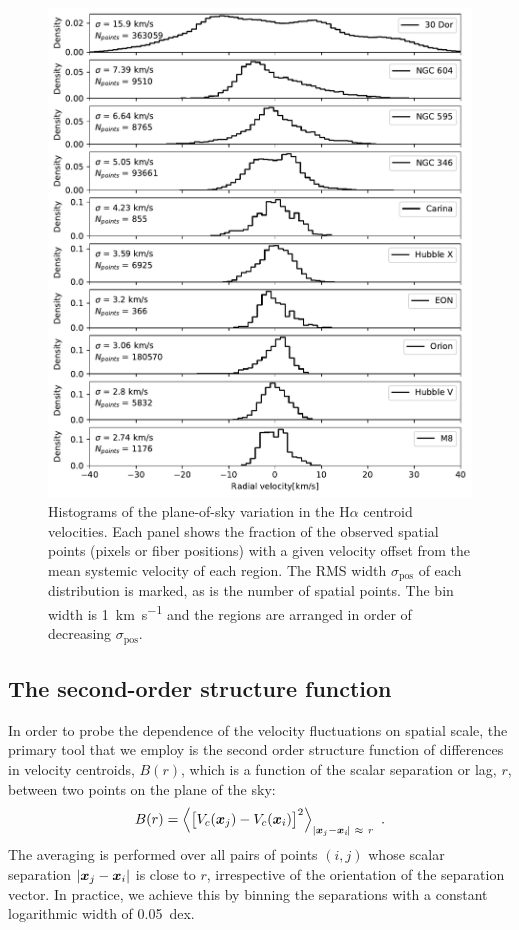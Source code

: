 \documentclass[fleqn,usenatbib, useAMS, a4paper]{mnras}
\newcommand\pos{\ensuremath{_{\mathrm{pos}}}}
\newcommand\ha{\ensuremath{\text{H}\alpha}}
\begin{document}
\begin{figure}
 \centering
 \includegraphics[width=5in]{Figures/pdfs}\par
 \caption{
   Histograms of the plane-of-sky variation in the \ha{} centroid velocities.
   Each panel shows the fraction of the observed spatial points
   (pixels or fiber positions)
   with a given velocity offset from the mean systemic velocity of each region.
   The RMS width \(\sigma\pos\) of each distribution is marked,
   as is the number of spatial points.
   The bin width is \SI{1}{km.s^{-1}} and the regions are arranged
   in order of decreasing \(\sigma\pos\).
 }
 \label{fig:pdfs}
\end{figure}


\subsection{The second-order structure function}
\label{sec:second-order-struct}


In order to probe the dependence of the velocity fluctuations
on spatial scale,
the primary tool that we employ is
the second order structure function of differences in velocity centroids,
$B(r)$, which is a function of the scalar separation or lag, \(r\),
between two points on the plane of the sky:
%
\newcommand\Abs[1]{\vert #1\vert}
\begin{equation}\label{eq:Br}
  B(r) = \left\langle 
  \bigl[
  V_{c}(\xx_j) - V_{c}(\xx_i)
  \bigr]^{2} \right \rangle_{\Abs{\xx_j - \xx_i\!} \ \approx \ r} \ .
\end{equation}
The averaging is performed over all pairs of points
\((i, j)\)
whose scalar separation \(\Abs{\xx_j - \xx_i}\) is close to \(r\),
irrespective of the orientation of the separation vector.
In practice, we achieve this by binning the separations with a constant
logarithmic width of \SI{0.05}{dex}.
\end{document}
